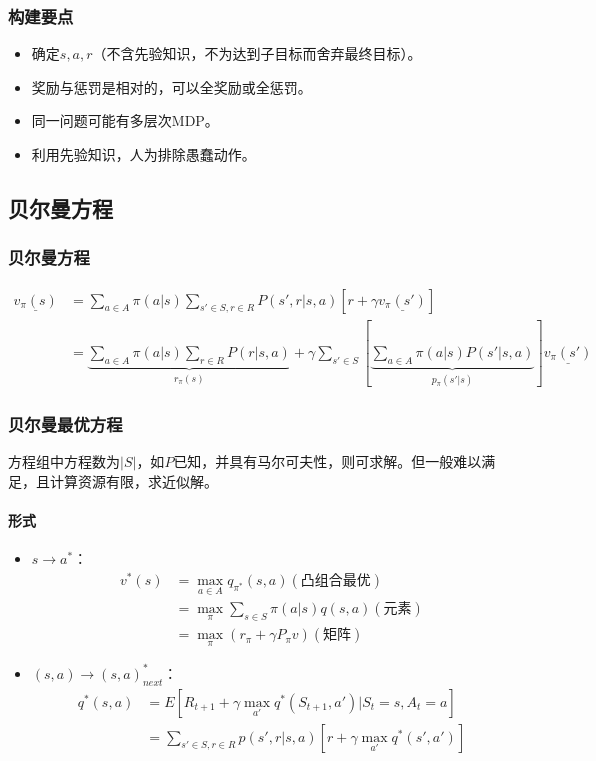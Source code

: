 \documentclass[
12pt, %
a4paper, 
oneside, %
headinclude,footinclude, %
]{scrartcl}
\begin{document}
\subsubsection[构建要点]{构建要点}
\begin{itemize}
\item 确定$ s,a,r $（不含先验知识，不为达到子目标而舍弃最终目标）。
\item 奖励与惩罚是相对的，可以全奖励或全惩罚。
\item 同一问题可能有多层次MDP。
\item 利用先验知识，人为排除愚蠢动作。
\end{itemize}
\subsection[贝尔曼方程]{贝尔曼方程}
\subsubsection[贝尔曼方程]{贝尔曼方程}
\begin{align*}
\underline{v_\pi(s)} &= \sum_{a \in A} \pi(a|s) \sum_{s' \in S, r \in R} P(s', r|s, a)[r + \gamma \underline{v_\pi(s')}] \\
&= \underbrace{\sum_{a \in A} \pi(a|s) \sum_{r \in R} P(r|s, a)}_{r_{\pi}(s)} + \gamma \sum_{s' \in S} [\underbrace{\sum_{a \in A} \pi(a|s)P(s'|s, a)}_{p_{\pi}(s'|s)}] \underline{v_\pi(s')} 
\end{align*}
\subsubsection[贝尔曼最优方程]{贝尔曼最优方程}
方程组中方程数为$ |S| $，如$ P $已知，并具有马尔可夫性，则可求解。但一般难以满足，且计算资源有限，求近似解。
\paragraph{形式}
\begin{itemize}
\item $ s \rightarrow a^* $：
\begin{align*}
v^*(s) &= \max_{a \in A} q_{\pi^*}(s, a) (\text{凸组合最优}) \\
&= \max_{\pi} \sum_{s \in S} \pi(a|s)q(s,a) (\text{元素}) \\
&= \max_{\pi} (r_\pi + \gamma P_\pi v) (\text{矩阵})
\end{align*}
\item $ (s, a) \rightarrow (s, a)_{next}^* $：
\begin{align*}
q^*(s, a) &= E[R_{t + 1} + \gamma \max_{a'} q^*(S_{t + 1}, a')|S_t = s, A_t = a] \\
&= \sum_{s' \in S, r \in R} p(s', r|s, a)[r + \gamma \max_{a'} q^*(s', a')]
\end{align*}
\end{itemize}
\end{document}
